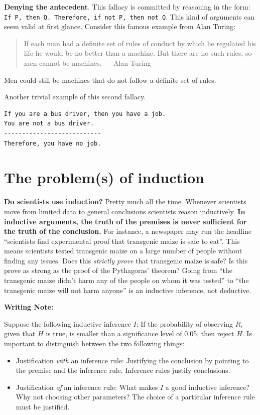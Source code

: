 \documentclass[
  12pt,
]{book}
\providecommand{\tightlist}{%
  \setlength{\itemsep}{0pt}\setlength{\parskip}{0pt}}
\begin{document}
\textbf{Denying the antecedent}. This fallacy is committed by reasoning in the form: \texttt{If\ P,\ then\ Q.\ Therefore,\ if\ not\ P,\ then\ not\ Q}. This kind of arguments can seem valid at first glance. Consider this famous example from Alan Turing:

\begin{quote}
If each man had a definite set of rules of conduct by which he regulated his life he would be no better than a machine. But there are no such rules, so men cannot be machines. --- Alan Turing
\end{quote}

Men could still be machines that do not follow a definite set of rules.

Another trivial example of this second fallacy.

\begin{verbatim}
If you are a bus driver, then you have a job.
You are not a bus driver.
---------------------------
Therefore, you have no job.
\end{verbatim}

\section{The problem(s) of induction}\label{problem-induction}

\textbf{Do scientists use induction?} Pretty much all the time. Whenever scientists move from limited data to general conclusions scientists reason inductively. \textbf{In inductive arguments, the truth of the premises is never sufficient for the truth of the conclusion.} For instance, a newspaper may run the headline ``scientists find experimental proof that transgenic maize is safe to eat''. This means scientists tested transgenic maize on a large number of people without finding any issues. Does this \emph{strictly prove} that transgenic maize is safe? Is this prove as strong as the proof of the Pythagoras' theorem? Going from ``the transgenic maize didn't harm any of the people on whom it was tested'' to ``the transgenic maize will not harm anyone'' is an inductive inference, not deductive.

\begin{tipbox}

\textbf{Writing Note:}

Suppose the following inductive inference \(I\): If the probability of observing \(R\), given that \(H\) is true, is smaller than a significance level of 0.05, then reject \(H\). Is important to distinguish between the two following things:

\begin{itemize}
\tightlist
\item
  Justification \emph{with} an inference rule: Justifying the conclusion by pointing to the premise and the inference rule. Inference rules justify conclusions.
\item
  Justification \emph{of} an inference rule: What makes \(I\) a good inductive inference? Why not choosing other parameters? The choice of a particular inference rule must be justified.
\end{itemize}

\end{tipbox}
\end{document}
